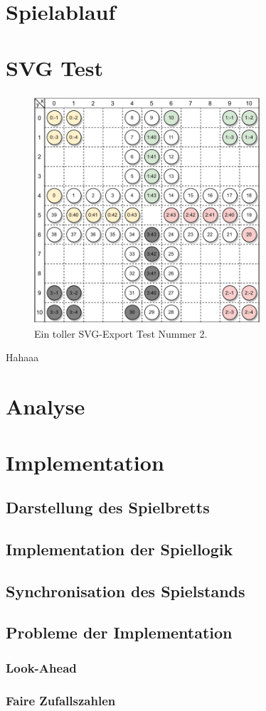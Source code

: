 \section{Spielablauf}
\section{SVG Test}
\begin{figure}[h]
\centering
\includegraphics[width=0.75\textwidth]{bilder/PDF_SVG/MAEDN_BOARD_DIAGRAM.pdf}
\caption{Ein toller SVG-Export Test Nummer 2.}
\end{figure}
Hahaaa
\section{Analyse}
\section{Implementation}
\subsection{Darstellung des Spielbretts}
\subsection{Implementation der Spiellogik}
\subsection{Synchronisation des Spielstands}
\subsection{Probleme der Implementation}
\subsubsection{Look-Ahead}
\subsubsection{Faire Zufallszahlen}
